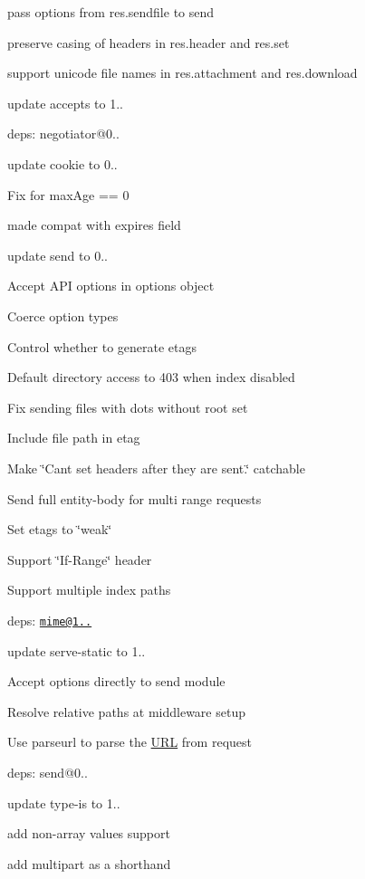 {\ttfamily 
\begin{DoxyItemize}
\item pass options from {\ttfamily res.\+sendfile} to {\ttfamily send}
\item preserve casing of headers in {\ttfamily res.\+header} and {\ttfamily res.\+set}
\item support unicode file names in {\ttfamily res.\+attachment} and {\ttfamily res.\+download}
\item update accepts to 1..
\begin{DoxyItemize}
\item deps\+: negotiator@0..
\end{DoxyItemize}
\item update cookie to 0..
\begin{DoxyItemize}
\item Fix for max\+Age == 0
\item made compat with expires field
\end{DoxyItemize}
\item update send to 0..
\begin{DoxyItemize}
\item Accept A\+PI options in options object
\item Coerce option types
\item Control whether to generate etags
\item Default directory access to 403 when index disabled
\item Fix sending files with dots without root set
\item Include file path in etag
\item Make \char`\"{}\+Can\textquotesingle{}t set headers after they are sent.\char`\"{} catchable
\item Send full entity-\/body for multi range requests
\item Set etags to \char`\"{}weak\char`\"{}
\item Support \char`\"{}\+If-\/\+Range\char`\"{} header
\item Support multiple index paths
\item deps\+: \href{mailto:mime@1.2.11}{\tt mime@1..}
\end{DoxyItemize}
\item update serve-\/static to 1..
\begin{DoxyItemize}
\item Accept options directly to {\ttfamily send} module
\item Resolve relative paths at middleware setup
\item Use parseurl to parse the \mbox{\hyperlink{namespace_u_r_l}{U\+RL}} from request
\item deps\+: send@0..
\end{DoxyItemize}
\item update type-\/is to 1..
\begin{DoxyItemize}
\item add non-\/array values support
\item add {\ttfamily multipart} as a shorthand
\end{DoxyItemize}
\end{DoxyItemize}}

